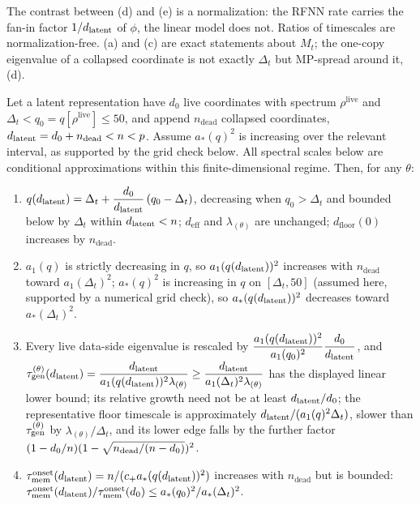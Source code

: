 The contrast between (d) and (e) is a normalization: the RFNN rate carries the fan-in factor $1/d_{\mathrm{latent}}$ of $\phi$, the linear model does not. Ratios of timescales are normalization-free. (a) and (c) are exact statements about $M_t$; the one-copy eigenvalue of a collapsed coordinate is not exactly $\Delta_t$ but MP-spread around it, (d).

\begin{proposition}\label{prop:deadblock-real}
Let a latent representation have $d_0$ live coordinates with spectrum $\rho^{\mathrm{live}}$ and $\Delta_t<q_0=q[\rho^{\mathrm{live}}]\le50$, and append $n_{\mathrm{dead}}$ collapsed coordinates, $d_{\mathrm{latent}}=d_0+n_{\mathrm{dead}}<n<p$. Assume $a_\ast(q)^2$ is increasing over the relevant interval, as supported by the grid check below. All spectral scales below are conditional approximations within this finite-dimensional regime. Then, for any $\theta$:
\begin{enumerate}
\item[(i)] $q(d_{\mathrm{latent}})=\Delta_t+\dfrac{d_0}{d_{\mathrm{latent}}}\,(q_0-\Delta_t)$, decreasing when $q_0>\Delta_t$ and bounded below by $\Delta_t$ within $d_{\mathrm{latent}}<n$; $d_{\mathrm{eff}}$ and $\lambda_{(\theta)}$ are unchanged; $d_{\mathrm{floor}}(0)$ increases by $n_{\mathrm{dead}}$.
\item[(ii)] $a_1(q)$ is strictly decreasing in $q$, so $a_1(q(d_{\mathrm{latent}}))^2$ increases with $n_{\mathrm{dead}}$ toward $a_1(\Delta_t)^2$; $a_\ast(q)^2$ is increasing in $q$ on $[\Delta_t,50]$ (assumed here, supported by a numerical grid check), so $a_\ast(q(d_{\mathrm{latent}}))^2$ decreases toward $a_\ast(\Delta_t)^2$.
\item[(iii)] Every live data-side eigenvalue is rescaled by $\dfrac{a_1(q(d_{\mathrm{latent}}))^2}{a_1(q_0)^2}\dfrac{d_0}{d_{\mathrm{latent}}}$, and $\tau_{\mathrm{gen}}^{(\theta)}(d_{\mathrm{latent}})=\dfrac{d_{\mathrm{latent}}}{a_1(q(d_{\mathrm{latent}}))^2\lambda_{(\theta)}}\ge\dfrac{d_{\mathrm{latent}}}{a_1(\Delta_t)^2\lambda_{(\theta)}}$ has the displayed linear lower bound; its relative growth need not be at least $d_{\mathrm{latent}}/d_0$; the representative floor timescale is approximately $d_{\mathrm{latent}}/(a_1(q)^2\Delta_t)$, slower than $\tau_{\mathrm{gen}}^{(\theta)}$ by $\lambda_{(\theta)}/\Delta_t$, and its lower edge falls by the further factor $(1-d_0/n)(1-\sqrt{n_{\mathrm{dead}}/(n-d_0)})^2$.
\item[(iv)] $\tau_{\mathrm{mem}}^{\mathrm{onset}}(d_{\mathrm{latent}})=n/(c_+a_\ast(q(d_{\mathrm{latent}}))^2)$ increases with $n_{\mathrm{dead}}$ but is bounded: $\tau_{\mathrm{mem}}^{\mathrm{onset}}(d_{\mathrm{latent}})/\tau_{\mathrm{mem}}^{\mathrm{onset}}(d_0)\le a_\ast(q_0)^2/a_\ast(\Delta_t)^2$.

\end{enumerate}
\end{proposition}
